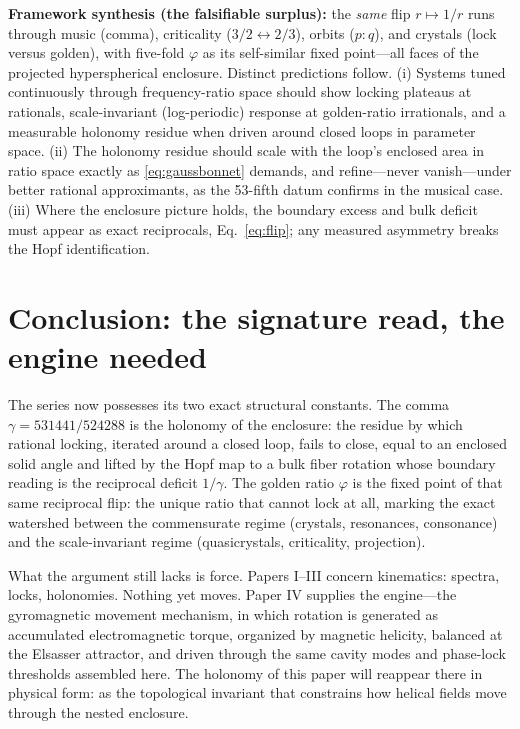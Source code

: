 \documentclass[11pt]{article}
\theoremstyle{remark}
\begin{document}
\textbf{Framework synthesis (the falsifiable surplus):} the \emph{same} flip $r \mapsto 1/r$ runs through music (comma), criticality ($3/2 \leftrightarrow 2/3$), orbits ($p{:}q$), and crystals (lock versus golden), with five-fold $\varphi$ as its self-similar fixed point---all faces of the projected hyperspherical enclosure. Distinct predictions follow. (i) Systems tuned continuously through frequency-ratio space should show locking plateaus at rationals, scale-invariant (log-periodic) response at golden-ratio irrationals, and a measurable holonomy residue when driven around closed loops in parameter space. (ii) The holonomy residue should scale with the loop's enclosed area in ratio space exactly as \eqref{eq:gaussbonnet} demands, and refine---never vanish---under better rational approximants, as the 53-fifth datum confirms in the musical case. (iii) Where the enclosure picture holds, the boundary excess and bulk deficit must appear as exact reciprocals, Eq.~\eqref{eq:flip}; any measured asymmetry breaks the Hopf identification.

\section{Conclusion: the signature read, the engine needed}
\label{sec:conclusion}

The series now possesses its two exact structural constants. The comma $\gamma = 531441/524288$ is the holonomy of the enclosure: the residue by which rational locking, iterated around a closed loop, fails to close, equal to an enclosed solid angle and lifted by the Hopf map to a bulk fiber rotation whose boundary reading is the reciprocal deficit $1/\gamma$. The golden ratio $\varphi$ is the fixed point of that same reciprocal flip: the unique ratio that cannot lock at all, marking the exact watershed between the commensurate regime (crystals, resonances, consonance) and the scale-invariant regime (quasicrystals, criticality, projection).

What the argument still lacks is force. Papers I--III concern kinematics: spectra, locks, holonomies. Nothing yet moves. Paper IV supplies the engine---the gyromagnetic movement mechanism, in which rotation is generated as accumulated electromagnetic torque, organized by magnetic helicity, balanced at the Elsasser attractor, and driven through the same cavity modes and phase-lock thresholds assembled here. The holonomy of this paper will reappear there in physical form: as the topological invariant that constrains how helical fields move through the nested enclosure.
\end{document}
